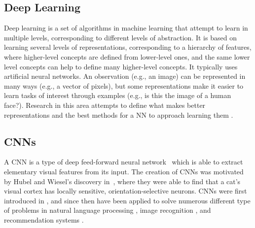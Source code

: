 
\subsection{Deep Learning}
Deep learning is a set of algorithms in machine learning that attempt to learn in multiple levels, corresponding to different levels of abstraction. It is based on learning several levels of representations, corresponding to a hierarchy of features, where higher-level concepts are defined from lower-level ones, and the same lower level concepts can help to define many higher-level concepts. It typically uses artificial neural networks. An observation (e.g., an image) can be represented in many ways (e.g., a vector of pixels), but some representations make it easier to learn tasks of interest through examples (e.g., is this the image of a human face?). Research in this area attempts to define what makes better representations and the best methods for a NN to approach learning them \cite{DeepLearning}.

\subsection{CNNs}

A CNN is a type of deep feed-forward neural network~\cite{cnn-star-galaxy} which is able to extract elementary visual features from its input. The creation of CNNs was motivated by Hubel and Wiesel's discovery in~\cite{hubel-wiesel-receptive-fields}, where they were able to find that a cat's visual cortex has locally sensitive, orientation-selective neurons. CNNs were first introduced in \citeyear{Lecun99objectrecognition} \cite{Lecun99objectrecognition}, and since then have been applied to solve numerous different type of problems in  natural language processing \cite{Collobert:2008:UAN:1390156.1390177}, image recognition \cite{cnn-star-galaxy}, and recommendation systems \cite{NIPS2013_5004}.

